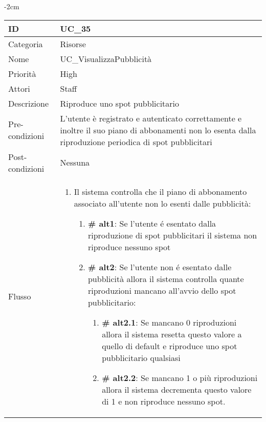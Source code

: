 \begin{center}
\begin{table}[bp]
    \centering
    \addtolength{\leftskip} {-2cm}
\begin{tabular}{ |p{2.6cm}|p{13cm}|  }
\hline
ID & UC\_35 \\\hline
Categoria & Risorse \\\hline
Nome & UC\_VisualizzaPubblicità\\\hline
Priorità & High \\\hline
Attori &  Staff \\\hline
Descrizione & Riproduce uno spot pubblicitario\\\hline
Pre-condizioni & L'utente è registrato e autenticato correttamente e inoltre il suo piano di abbonamenti non lo esenta dalla riproduzione periodica di spot pubblicitari\\\hline
Post-condizioni & Nessuna\\\hline
Flusso &  	\begin{enumerate}
		\item Il sistema controlla che il piano di abbonamento associato all'utente non lo esenti dalle pubblicità:
		 \begin{enumerate}[label*=\arabic*.]
			\item \textbf{\# alt1}: Se l'utente \'e esentato dalla riproduzione di spot pubblicitari il sistema non riproduce nessuno spot
			\item \textbf{\# alt2}: Se l'utente non \'e esentato dalle pubblicità allora il sistema controlla quante riproduzioni mancano all'avvio dello spot pubblicitario:
			 \begin{enumerate}[label*=\arabic*.]
				\item \textbf{\# alt2.1}: Se mancano 0 riproduzioni allora il sistema resetta questo valore a quello di default e riproduce uno spot pubblicitario qualsiasi
				\item \textbf{\# alt2.2}: Se mancano 1 o più riproduzioni allora il sistema decrementa questo valore di 1 e non riproduce nessuno spot.
			\end{enumerate}
					\end{enumerate}

		\end{enumerate}\\\hline
\end{tabular}
\label{table_use_case:35}\newline
\end{table}


\end{center}
